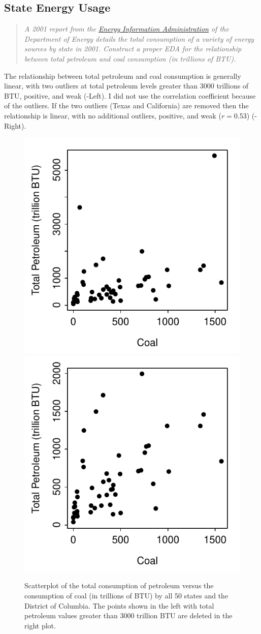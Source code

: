 \documentclass[10pt,openany]{book}\usepackage[]{graphicx}\usepackage[]{color}
\newenvironment{knitrout}{}{} %
\begin{document}
\newpage
\subsection*{State Energy Usage}
\begin{quote}
\textit{A 2001 report from the \href{http://www.eia.doe.gov/}{Energy Information Administration} of the Department of Energy details the total consumption of a variety of energy sources by state in 2001. Construct a proper EDA for the relationship between total petroleum and coal consumption (in trillions of BTU).}
\end{quote}

The relationship between total petroleum and coal consumption is generally linear, with two outliers at total petroleum levels greater than 3000 trillions of BTU, positive, and weak (-Left). I did not use the correlation coefficient because of the outliers. If the two outliers (Texas and California) are removed then the relationship is linear, with no additional outliers, positive, and weak ($r=$0.53) (-Right).

\begin{knitrout}
\color{fgcolor}\begin{figure}[hbtp]

{\centering \includegraphics[width=.4\linewidth]{Figs/scatNRG1-1} 
\includegraphics[width=.4\linewidth]{Figs/scatNRG1-2} 

}

\caption[Scatterplot of the total consumption of petroleum versus the consumption of coal (in trillions of BTU) by all 50 states and the District of Columbia]{Scatterplot of the total consumption of petroleum versus the consumption of coal (in trillions of BTU) by all 50 states and the District of Columbia. The points shown in the left with total petroleum values greater than 3000 trillion BTU are deleted in the right plot.}\label{fig:scatNRG1}
\end{figure}


\end{knitrout}
\end{document}
